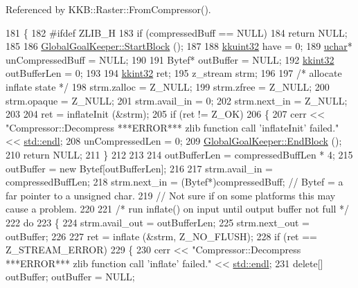 Referenced by K\+K\+B\+::\+Raster\+::\+From\+Compressor().


\begin{DoxyCode}
181 \{
182 \textcolor{preprocessor}{#ifdef ZLIB\_H}
183   \textcolor{keywordflow}{if}  (compressedBuff == NULL)
184     \textcolor{keywordflow}{return}  NULL;
185 
186   \hyperlink{class_k_k_b_1_1_global_goal_keeper_a05d7aab73a0cc12c01f4dd6e8d3da839}{GlobalGoalKeeper::StartBlock} ();
187 
188   \hyperlink{namespace_k_k_b_af8d832f05c54994a1cce25bd5743e19a}{kkuint32}   have              = 0;
189   \hyperlink{namespace_k_k_b_ace9969169bf514f9ee6185186949cdf7}{uchar}*     unCompressedBuff  = NULL;
190 
191   Bytef*     outBuffer    = NULL;
192   \hyperlink{namespace_k_k_b_a8fa4952cc84fda1de4bec1fbdd8d5b1b}{kkint32}    outBufferLen = 0;
193 
194   \hyperlink{namespace_k_k_b_a8fa4952cc84fda1de4bec1fbdd8d5b1b}{kkint32}    ret;
195   z\_stream   strm;
196 
197   \textcolor{comment}{/* allocate inflate state */}
198   strm.zalloc   = Z\_NULL;
199   strm.zfree    = Z\_NULL;
200   strm.opaque   = Z\_NULL;
201   strm.avail\_in = 0;
202   strm.next\_in  = Z\_NULL;
203 
204   ret = inflateInit (&strm);
205   \textcolor{keywordflow}{if}  (ret != Z\_OK)
206   \{
207     cerr << \textcolor{stringliteral}{"Compressor::Decompress  ***ERROR***  zlib function call 'inflateInit'  failed."} << 
      \hyperlink{namespace_k_k_b_ad1f50f65af6adc8fa9e6f62d007818a8}{std::endl};
208     unCompressedLen = 0;
209     \hyperlink{class_k_k_b_1_1_global_goal_keeper_a4e03a2807ca2f00c359da8625afb4cc5}{GlobalGoalKeeper::EndBlock} ();
210     \textcolor{keywordflow}{return} NULL;
211   \}
212 
213 
214   outBufferLen = compressedBuffLen * 4;
215   outBuffer    = \textcolor{keyword}{new} Bytef[outBufferLen];
216 
217   strm.avail\_in = compressedBuffLen;
218   strm.next\_in  = (Bytef*)compressedBuff;  \textcolor{comment}{// Bytef = a far pointer to a unsigned char.    }
219                                            \textcolor{comment}{// Not sure if on some platforms this may cause a problem.}
220 
221   \textcolor{comment}{/* run inflate() on input until output buffer not full */}
222   \textcolor{keywordflow}{do} 
223   \{
224     strm.avail\_out = outBufferLen;
225     strm.next\_out  = outBuffer;
226 
227     ret = inflate (&strm, Z\_NO\_FLUSH);
228     \textcolor{keywordflow}{if}  (ret == Z\_STREAM\_ERROR)
229     \{
230       cerr << \textcolor{stringliteral}{"Compressor::Decompress  ***ERROR***  zlib function call 'inflate'  failed."}  << 
      \hyperlink{namespace_k_k_b_ad1f50f65af6adc8fa9e6f62d007818a8}{std::endl};
231       \textcolor{keyword}{delete}[]  outBuffer;  outBuffer = NULL;

\end{DoxyCode}
